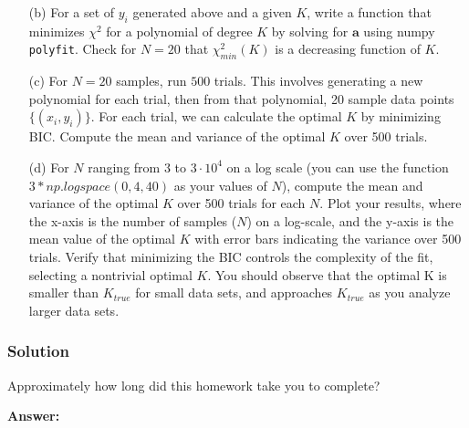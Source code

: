 \documentclass[submit]{harvardml}
\begin{document}
\begin{problem}
\begin{itemize}
        \item[(b)] For a set of $y_i$ generated above and a given $K$, write a function that minimizes $\chi^2$ for a polynomial of degree $K$ by solving for $\mathbf{a}$ using
                   numpy \texttt{polyfit}.                   Check for $N=20$ that $\chi^2_{min}(K)$ is a decreasing function of $K$. 
        
        \item[(c)] For $N=20$ samples, run $500$ trials. This involves generating a new polynomial for each trial, then from that polynomial, 20 sample data points $\{(x_i,y_i)\}$. For each trial, 
                          we can calculate the optimal $K$ by minimizing BIC. Compute the mean and variance of the optimal $K$ over 500 trials.
        
        \item[(d)] For $N$ ranging from $3$ to $3 \cdot 10^4$ on a log scale (you can use the function $3*np.logspace(0,4, 40)$ as your values of $N$), 
                   compute the mean and variance of the optimal $K$ over 500 trials for each $N$. Plot your results, where the x-axis is the number of samples ($N$) on a log-scale, 
                   and the y-axis is the mean value of the optimal $K$ with error bars indicating the variance over 500 trials. Verify that minimizing the BIC controls the complexity of the fit, 
                   selecting a nontrivial optimal $K$. You should observe that the optimal K is smaller than $K_{true}$ for small data sets, and approaches $K_{true}$ as you 
                   analyze larger data sets.
        
    \end{itemize}


\end{problem}



\subsubsection*{Solution}




\newpage
\begin{problem}[Calibration, 1pt]
Approximately how long did this homework take you to complete?
\end{problem}
\textbf{Answer:}
\end{document}
